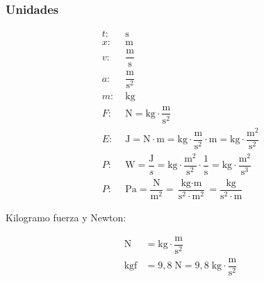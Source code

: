 \subsubsection*{Unidades}

\vspace{-3em}
\begin{align*}
t:\;& \text{s}\\
x:\;& \text{m}\\
v:\;& \dfrac{\text{m}}{\text{s}}\\
a:\;& \dfrac{\text{m}}{\text{s}^2}\\
m:\;& \text{kg}\\
F:\;&  \text{N} = \text{kg}\cdot \dfrac{\text{m}}{\text{s}^2}\\
E:\;&  \text{J} = \text{N}\cdot\text{m} = \text{kg}\cdot \dfrac{\text{m}}{\text{s}^2} \cdot \text{m} = \text{kg}\cdot \dfrac{\text{m}^2}{\text{s}^2}\\
P:\;& \text{W} = \dfrac{\text{J}}{s} = \text{kg}\cdot \dfrac{\text{m}^2}{\text{s}^2} \cdot \dfrac{1}{\text{s}} = \text{kg}\cdot \dfrac{\text{m}^2}{\text{s}^3}\\
P:\;&\text{Pa} = \dfrac{\text{N}}{\text{m}^2} = \dfrac{\text{kg}\cdot \text{m}}{\text{s}^2 \cdot \text{m}^2} = \dfrac{\text{kg}}{\text{s}^2 \cdot \text{m}}
\end{align*}

Kilogramo fuerza y Newton:

\begin{align*}
    \text{N} &= \text{kg} \cdot \dfrac{\text{m}}{\text{s}^2}\\
    \text{kgf} &= 9,8 \;\text{N} = 9,8\;\text{kg} \cdot \dfrac{\text{m}}{\text{s}^2} \\
\end{align*}

